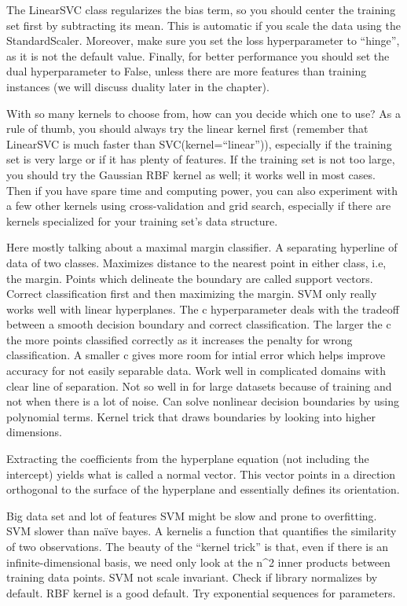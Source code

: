 \documentclass[]{book}
\begin{document}
The LinearSVC class regularizes the bias term, so you should center the training set first by subtracting its mean. This is automatic if you scale the data using the StandardScaler. Moreover, make sure you set the loss hyperparameter to ``hinge'', as it is not the default value. Finally, for better performance you should set the dual hyperparameter to False, unless there are more features than training instances (we will discuss duality later in the chapter).

With so many kernels to choose from, how can you decide which one to use? As a rule of thumb, you should always try the linear kernel first (remember that LinearSVC is much faster than SVC(kernel=``linear'')), especially if the training set is very large or if it has plenty of features. If the training set is not too large, you should try the Gaussian RBF kernel as well; it works well in most cases. Then if you have spare time and computing power, you can also experiment with a few other kernels using cross-validation and grid search, especially if there are kernels specialized for your training set's data structure.

Here mostly talking about a maximal margin classifier. A separating hyperline of data of two classes. Maximizes distance to the nearest point in either class, i.e, the margin. Points which delineate the boundary are called support vectors. Correct classification first and then maximizing the margin. SVM only really works well with linear hyperplanes. The c hyperparameter deals with the tradeoff between a smooth decision boundary and correct classification. The larger the c the more points classified correctly as it increases the penalty for wrong classification. A smaller c gives more room for intial error which helps improve accuracy for not easily separable data. Work well in complicated domains with clear line of separation. Not so well in for large datasets because of training and not when there is a lot of noise. Can solve nonlinear decision boundaries by using polynomial terms. Kernel trick that draws boundaries by looking into higher dimensions.

Extracting the coefficients from the hyperplane equation (not including the intercept) yields what is called a normal vector. This vector points in a direction orthogonal to the surface of the hyperplane and essentially defines its orientation.

Big data set and lot of features SVM might be slow and prone to overfitting. SVM slower than naïve bayes. A kernelis a function that quantifies the similarity of two observations. The beauty of the ``kernel trick'' is that, even if there is an infinite-dimensional basis, we need only look at the n\^{}2 inner products between training data points. SVM not scale invariant. Check if library normalizes by default. RBF kernel is a good default. Try exponential sequences for parameters.
\end{document}
